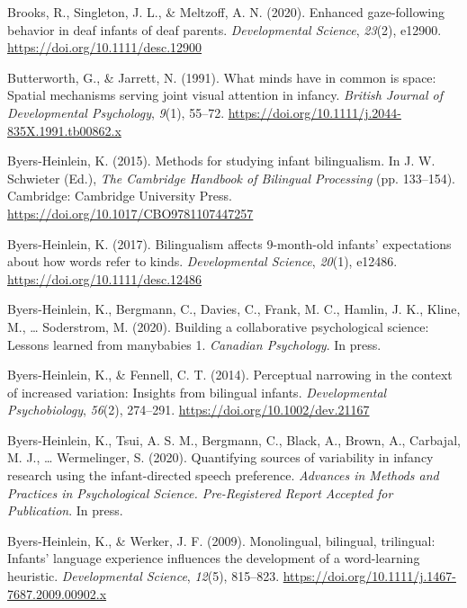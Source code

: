 \documentclass[
  english,
  ,man,floatsintext]{apa6}
\begin{document}
\leavevmode\hypertarget{ref-Brooks_etal_2020}{}%
Brooks, R., Singleton, J. L., \& Meltzoff, A. N. (2020). Enhanced gaze-following behavior in deaf infants of deaf parents. \emph{Developmental Science}, \emph{23}(2), e12900. \url{https://doi.org/10.1111/desc.12900}

\leavevmode\hypertarget{ref-Butterworth_Jarrett_1991}{}%
Butterworth, G., \& Jarrett, N. (1991). What minds have in common is space: Spatial mechanisms serving joint visual attention in infancy. \emph{British Journal of Developmental Psychology}, \emph{9}(1), 55--72. \url{https://doi.org/10.1111/j.2044-835X.1991.tb00862.x}

\leavevmode\hypertarget{ref-Byers-Heinlein_2015}{}%
Byers-Heinlein, K. (2015). Methods for studying infant bilingualism. In J. W. Schwieter (Ed.), \emph{The Cambridge Handbook of Bilingual Processing} (pp. 133--154). Cambridge: Cambridge University Press. \url{https://doi.org/10.1017/CBO9781107447257}

\leavevmode\hypertarget{ref-Byers-Heinlein_2017}{}%
Byers-Heinlein, K. (2017). Bilingualism affects 9-month-old infants' expectations about how words refer to kinds. \emph{Developmental Science}, \emph{20}(1), e12486. \url{https://doi.org/10.1111/desc.12486}

\leavevmode\hypertarget{ref-Byers-Heinlein_etal_2020a}{}%
Byers-Heinlein, K., Bergmann, C., Davies, C., Frank, M. C., Hamlin, J. K., Kline, M., \ldots{} Soderstrom, M. (2020). Building a collaborative psychological science: Lessons learned from manybabies 1. \emph{Canadian Psychology}. In press.

\leavevmode\hypertarget{ref-Byers-Heinlein_Fennell_2014}{}%
Byers-Heinlein, K., \& Fennell, C. T. (2014). Perceptual narrowing in the context of increased variation: Insights from bilingual infants. \emph{Developmental Psychobiology}, \emph{56}(2), 274--291. \url{https://doi.org/10.1002/dev.21167}

\leavevmode\hypertarget{ref-Byers-Heinlein_etal_2020b}{}%
Byers-Heinlein, K., Tsui, A. S. M., Bergmann, C., Black, A., Brown, A., Carbajal, M. J., \ldots{} Wermelinger, S. (2020). Quantifying sources of variability in infancy research using the infant-directed speech preference. \emph{Advances in Methods and Practices in Psychological Science. Pre-Registered Report Accepted for Publication}. In press.

\leavevmode\hypertarget{ref-Byers-Heinlein_Werker_2009}{}%
Byers-Heinlein, K., \& Werker, J. F. (2009). Monolingual, bilingual, trilingual: Infants' language experience influences the development of a word-learning heuristic. \emph{Developmental Science}, \emph{12}(5), 815--823. \url{https://doi.org/10.1111/j.1467-7687.2009.00902.x}
\end{document}
